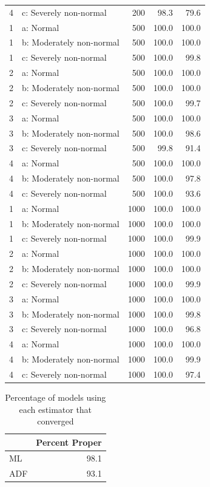 \documentclass[
  letterpaper,
  DIV=11,
  numbers=noendperiod]{scrartcl}
\begin{document}
\begin{longtable}[]{@{}rlrrr@{}}
4 & c: Severely non-normal & 200 & 98.3 & 79.6 \\
1 & a: Normal & 500 & 100.0 & 100.0 \\
1 & b: Moderately non-normal & 500 & 100.0 & 100.0 \\
1 & c: Severely non-normal & 500 & 100.0 & 99.8 \\
2 & a: Normal & 500 & 100.0 & 100.0 \\
2 & b: Moderately non-normal & 500 & 100.0 & 100.0 \\
2 & c: Severely non-normal & 500 & 100.0 & 99.7 \\
3 & a: Normal & 500 & 100.0 & 100.0 \\
3 & b: Moderately non-normal & 500 & 100.0 & 98.6 \\
3 & c: Severely non-normal & 500 & 99.8 & 91.4 \\
4 & a: Normal & 500 & 100.0 & 100.0 \\
4 & b: Moderately non-normal & 500 & 100.0 & 97.8 \\
4 & c: Severely non-normal & 500 & 100.0 & 93.6 \\
1 & a: Normal & 1000 & 100.0 & 100.0 \\
1 & b: Moderately non-normal & 1000 & 100.0 & 100.0 \\
1 & c: Severely non-normal & 1000 & 100.0 & 99.9 \\
2 & a: Normal & 1000 & 100.0 & 100.0 \\
2 & b: Moderately non-normal & 1000 & 100.0 & 100.0 \\
2 & c: Severely non-normal & 1000 & 100.0 & 99.9 \\
3 & a: Normal & 1000 & 100.0 & 100.0 \\
3 & b: Moderately non-normal & 1000 & 100.0 & 99.8 \\
3 & c: Severely non-normal & 1000 & 100.0 & 96.8 \\
4 & a: Normal & 1000 & 100.0 & 100.0 \\
4 & b: Moderately non-normal & 1000 & 100.0 & 99.9 \\
4 & c: Severely non-normal & 1000 & 100.0 & 97.4 \\

\end{longtable}

\begin{longtable}[]{@{}lr@{}}

\caption{\label{tbl-convergence_percs_summary}Percentage of models using
each estimator that converged}

\tabularnewline

\toprule\noalign{}
& Percent Proper \\
\midrule\noalign{}
\endhead
\bottomrule\noalign{}
\endlastfoot
ML & 98.1 \\
ADF & 93.1 \\

\end{longtable}
\end{document}
